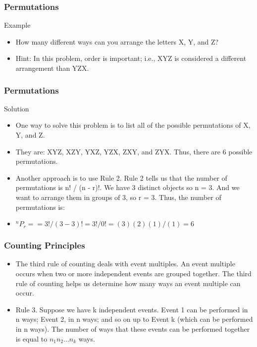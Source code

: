 \begin{frame}[fragile]\frametitle{Permutations}
Example
\begin{itemize}
\item How many different ways can you arrange the letters X, Y, and Z? 
\item Hint: In this problem, order is important; i.e., XYZ is considered a different arrangement than YZX.
\end{itemize}
\end{frame}



\begin{frame}[fragile]\frametitle{Permutations}
Solution
\begin{itemize}
\item One way to solve this problem is to list all of the possible permutations of X, Y, and Z. 
\item They are: XYZ, XZY, YXZ, YZX, ZXY, and ZYX. Thus, there are 6 possible permutations.
\item Another approach is to use Rule 2. Rule 2 tells us that the number of permutations is n! / (n - r)!. We have 3 distinct objects so n = 3. And we want to arrange them in groups of 3,
so r = 3. Thus, the number of permutations is:
\item ${}^{n}P_{r} = = 3! / (3 - 3)! = 3! /0! = (3)(2)(1)/(1) = 6$
\end{itemize}
\end{frame}


\begin{frame}[fragile]\frametitle{Counting Principles}
\begin{itemize}
\item The third rule of counting deals with event multiples. An event multiple occurs when two or more independent events are grouped together. The third rule of counting helps us
determine how many ways an event multiple can occur.
\item Rule 3. Suppose we have k independent events. Event 1 can be performed in n  ways; Event 2, in n  ways; and so on up to Event k (which can be performed in n  ways). The
number of ways that these events can be performed together is equal to $n_1 n_2 \ldots n_k$ ways.
\end{itemize}

\end{frame}


